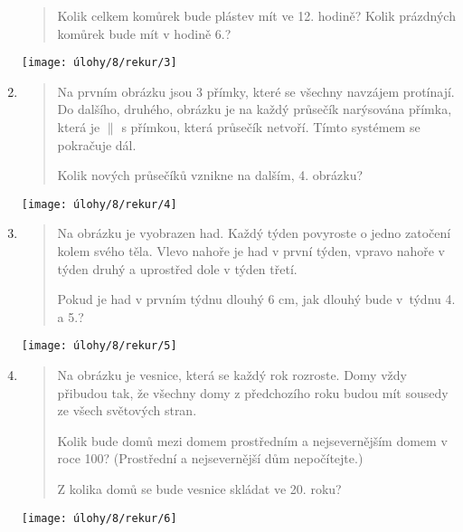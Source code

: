 \begin{enumerate}
\begin{minipage}[t]{\linewidth}
\begin{quote}
            Kolik celkem komůrek bude plástev mít ve 12. hodině? Kolik prázdných komůrek bude mít v hodině 6.?
        \end{quote}
        \centering
        \texttt{[image: úlohy/8/rekur/3]}
    \end{minipage}

    \item
    \begin{minipage}[t]{\linewidth}
        \begin{quote}
            Na prvním obrázku jsou 3 přímky, které se všechny navzájem protínají. Do dalšího, druhého, obrázku je na každý průsečík narýsována přímka, která je $\|$ s přímkou, která průsečík netvoří. Tímto systémem se pokračuje dál.

            Kolik nových průsečíků vznikne na dalším, 4. obrázku?
        \end{quote}
        \centering
        \texttt{[image: úlohy/8/rekur/4]}
    \end{minipage}

    \item
    \begin{minipage}[t]{\linewidth}
        \begin{quote}
            Na obrázku je vyobrazen had. Každý týden povyroste o jedno zatočení kolem svého těla. Vlevo nahoře je had v první týden, vpravo nahoře v týden druhý a uprostřed dole v týden třetí.

            Pokud je had v prvním týdnu dlouhý 6 cm, jak dlouhý bude v~týdnu 4. a 5.?
        \end{quote}
        \centering
        \texttt{[image: úlohy/8/rekur/5]}
    \end{minipage}

    \item
    \begin{minipage}[t]{\linewidth}
        \begin{quote}
            Na obrázku je vesnice, která se každý rok rozroste. Domy vždy přibudou tak, že všechny domy z předchozího roku budou mít sousedy ze všech světových stran.

            Kolik bude domů mezi domem prostředním a nejsevernějším domem v roce 100? (Prostřední a nejsevernější dům nepočítejte.)

            Z kolika domů se bude vesnice skládat ve 20. roku?
        \end{quote}
        \centering
        \texttt{[image: úlohy/8/rekur/6]}
    \end{minipage}


\end{enumerate}

